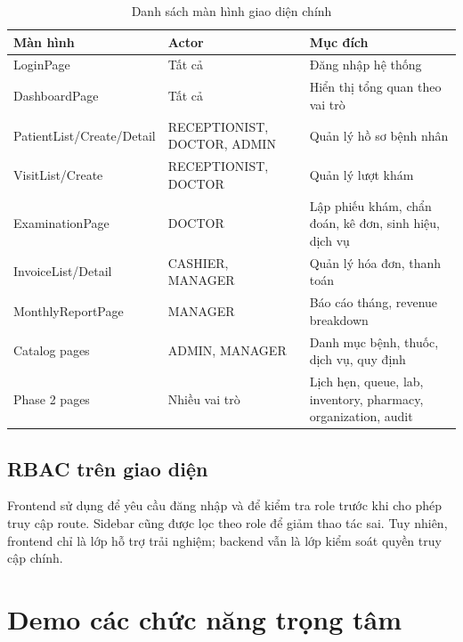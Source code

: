\begin{longtable}{|p{4cm}|p{3.2cm}|p{7cm}|}
\caption{Danh sách màn hình giao diện chính}\\
\hline
\textbf{Màn hình} & \textbf{Actor} & \textbf{Mục đích} \\
\hline
LoginPage & Tất cả & Đăng nhập hệ thống \\
\hline
DashboardPage & Tất cả & Hiển thị tổng quan theo vai trò \\
\hline
PatientList/\allowbreak Create/\allowbreak Detail & RECEPTIONIST, DOCTOR, ADMIN & Quản lý hồ sơ bệnh nhân \\
\hline
VisitList/Create & RECEPTIONIST, DOCTOR & Quản lý lượt khám \\
\hline
ExaminationPage & DOCTOR & Lập phiếu khám, chẩn đoán, kê đơn, sinh hiệu, dịch vụ \\
\hline
InvoiceList/Detail & CASHIER, MANAGER & Quản lý hóa đơn, thanh toán \\
\hline
MonthlyReportPage & MANAGER & Báo cáo tháng, revenue breakdown \\
\hline
Catalog pages & ADMIN, MANAGER & Danh mục bệnh, thuốc, dịch vụ, quy định \\
\hline
Phase 2 pages & Nhiều vai trò & Lịch hẹn, queue, lab, inventory, pharmacy, organization, audit \\
\hline
\end{longtable}

\subsection{RBAC trên giao diện}

Frontend sử dụng  để yêu cầu đăng nhập và  để kiểm tra role trước khi cho phép truy cập route. Sidebar cũng được lọc theo role để giảm thao tác sai. Tuy nhiên, frontend chỉ là lớp hỗ trợ trải nghiệm; backend vẫn là lớp kiểm soát quyền truy cập chính.

\section{Demo các chức năng trọng tâm}

